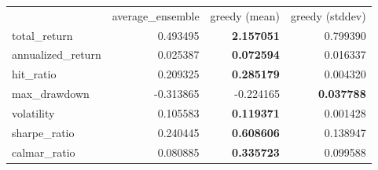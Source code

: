 \begin{tabular}{lrrr}
 & average_ensemble & greedy (mean) & greedy (stddev) \\
total_return & 0.493495 & \bfseries 2.157051 & 0.799390 \\
annualized_return & 0.025387 & \bfseries 0.072594 & 0.016337 \\
hit_ratio & 0.209325 & \bfseries 0.285179 & 0.004320 \\
max_drawdown & -0.313865 & -0.224165 & \bfseries 0.037788 \\
volatility & 0.105583 & \bfseries 0.119371 & 0.001428 \\
sharpe_ratio & 0.240445 & \bfseries 0.608606 & 0.138947 \\
calmar_ratio & 0.080885 & \bfseries 0.335723 & 0.099588 \\
\end{tabular}
